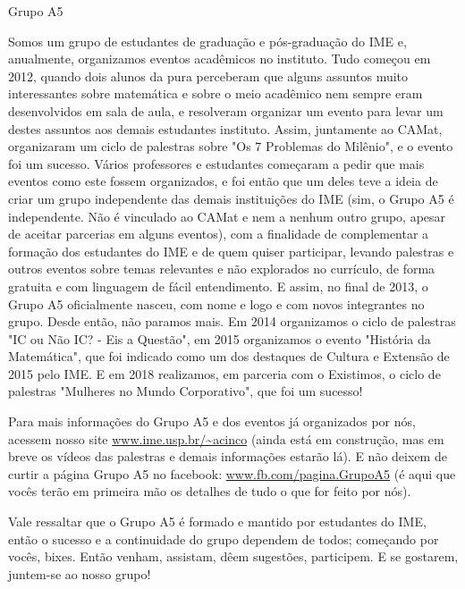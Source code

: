 \begin{subsecao}{Grupo A5}


Somos um grupo de estudantes de graduação e pós-graduação do IME e, anualmente,
organizamos eventos acadêmicos no instituto.  Tudo começou em 2012, quando dois
alunos da pura perceberam que alguns assuntos muito interessantes sobre
matemática e sobre o meio acadêmico nem sempre eram desenvolvidos em sala de
aula, e resolveram organizar um evento para levar um destes assuntos aos demais
estudantes instituto. Assim, juntamente ao CAMat, organizaram um ciclo de
palestras sobre "Os 7 Problemas do Milênio", e o evento foi um sucesso.  Vários
professores e estudantes começaram a pedir que mais eventos como este fossem
organizados, e foi então que um deles teve a ideia de criar um grupo
independente das demais instituições do IME (sim, o Grupo A5 é independente. Não
é vinculado ao CAMat e nem a nenhum outro grupo, apesar de aceitar parcerias em
alguns eventos), com a finalidade de complementar a formação dos estudantes do
IME e de quem quiser participar, levando palestras e outros eventos sobre temas
relevantes e não explorados no currículo, de forma gratuita e com linguagem de
fácil entendimento.  E assim, no final de 2013, o Grupo A5 oficialmente nasceu,
com nome e logo e com novos integrantes no grupo.  Desde então, não paramos
mais. Em 2014 organizamos o ciclo de palestras "IC ou Não IC? - Eis a Questão",
em 2015 organizamos o evento "História da Matemática", que foi indicado como um
dos destaques de Cultura e Extensão de 2015 pelo IME. E em 2018 realizamos, em 
parceria com o Existimos, o ciclo de palestras "Mulheres no Mundo Corporativo",
que foi um sucesso! 

Para mais informações do Grupo A5 e dos eventos já organizados por nós, acessem
nosso site \url{www.ime.usp.br/~acinco} (ainda está em construção, mas em breve os
vídeos das palestras e demais informações estarão lá). E não deixem de curtir
a página Grupo A5 no facebook: \url{www.fb.com/pagina.GrupoA5} (é aqui que
vocês terão em primeira mão os detalhes de tudo o que for feito por nós).

Vale ressaltar que o Grupo A5 é formado e mantido por estudantes do IME, então o
sucesso e a continuidade do grupo dependem de todos; começando por vocês,
bixes. Então venham, assistam, dêem sugestões, participem. E se gostarem,
juntem-se ao nosso grupo!

\end{subsecao}

